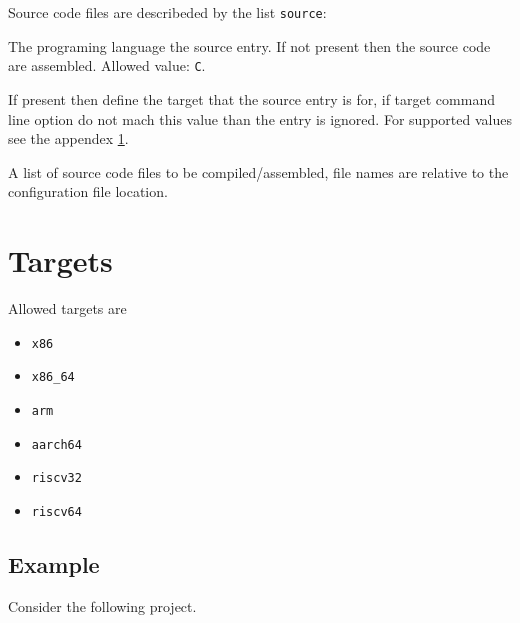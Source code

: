 \documentclass[
   article,                      %
   10pt,                         %
   openright,                    %
   oneside,                      %
   a4paper,                      %
   sumario = tradicional,        %
   english,                      %
   xcolor=table                  %
]{abntex2}
\begin{document}
Source code files are describeded by the list \texttt{source}:

\begin{description}[style=multiline,leftmargin=5cm]
   \item[\texttt{language}]
   The programing language the source entry.
   If not present then the source code are assembled.
   Allowed value: \texttt{C}.
   \item[\texttt{target}]
   If present then define the target that the source entry is for,
   if target command line option do not mach this value than
   the entry is ignored.
   For supported values see the appendex \ref{apendice:target}.
   \item[\texttt{files}]
   A list of source code files to be compiled/assembled,
   file names are relative to the configuration file location.
\end{description}


   \postextual
   
   \apendices
   \renewcommand{\thesection}{\Alph{section}}

\section{Targets}
\label{apendice:target}

Allowed targets are
\begin{itemize}
   \item \texttt{x86}
   \item \texttt{x86\_64}
   \item \texttt{arm}
   \item \texttt{aarch64}
   \item \texttt{riscv32}
   \item \texttt{riscv64}
\end{itemize}

\subsection{Example}

Consider the following project.
\end{document}
